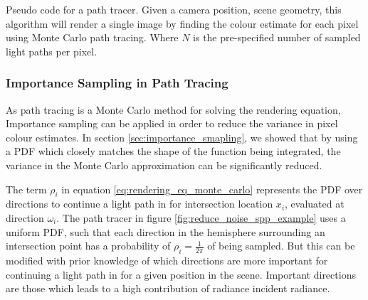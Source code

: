 \documentclass[../dissertation.tex]{subfiles}
\begin{document}
\begin{algorithm}[H]
\label{alg:forward_path_tracing}
\SetAlgoLined
 \caption{Pseudo code for a path tracer. Given a camera position, scene geometry, this algorithm will render a single image by finding the colour estimate for each pixel using Monte Carlo path tracing. Where $N$ is the pre-specified number of sampled light paths per pixel.}
\end{algorithm}


\subsubsection{Importance Sampling in Path Tracing}

As path tracing is a Monte Carlo method for solving the rendering equation, Importance sampling can be applied in order to reduce the variance in pixel colour estimates. In section \ref{sec:importance_smapling}, we showed that by using a PDF which closely matches the shape of the function being integrated, the variance in the Monte Carlo approximation can be significantly reduced. 

The term $\rho_i$ in equation \ref{eq:rendering_eq_monte_carlo} represents the PDF over directions to continue a light path in for intersection location $x_i$, evaluated at direction $\omega_i$. The path tracer in figure \ref{fig:reduce_noise_spp_example} uses a uniform PDF, such that each direction in the hemisphere surrounding an intersection point has a probability of $\rho_i = \frac{1}{2\pi}$ of being sampled. But this can be modified with prior knowledge of which directions are more important for continuing a light path in for a given position in the scene. Important directions are those which leads to a high contribution of radiance incident radiance.
\end{document}
